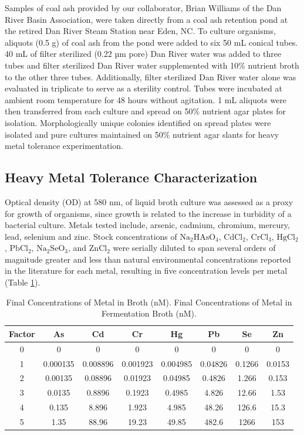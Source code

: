 \documentclass[ms, hidelinks]{uncgdissertationexp3}
\theoremstyle{plain}
\theoremstyle{definition}
\theoremstyle{remark}
\newcommand{\titlecaption}[2]{\caption[#1]{#1. #2}}
\begin{document}
Samples of coal ash provided by our collaborator, Brian Williams of the Dan River Basin Association, were taken directly from a coal ash retention pond at the retired Dan River Steam Station near Eden, NC. To culture organisms, aliquots (0.5 g) of coal ash from the pond were added to six 50 mL conical tubes. 40 mL of filter sterilized (0.22 µm pore) Dan River water was added to three tubes and filter sterilized Dan River water supplemented with 10\% nutrient broth to the other three tubes. Additionally, filter sterilized Dan River water alone was evaluated in triplicate to serve as a sterility control. Tubes were incubated at ambient room temperature for 48 hours without agitation. 1 mL aliquots were then transferred from each culture and spread on 50\% nutrient agar plates for isolation. Morphologically unique colonies identified on spread plates were isolated and pure cultures maintained on 50\% nutrient agar slants for heavy metal tolerance experimentation. 

\subsection{Heavy Metal Tolerance Characterization}\label{heavy-metal-tolerance-characterization}

Optical density (OD) at 580 nm, of liquid broth culture was assessed as a proxy for growth of organisms, since growth is related to the increase in turbidity of a bacterial culture. Metals tested include, arsenic, cadmium, chromium, mercury, lead, selenium and zinc. Stock concentrations of \(\mathrm{Na_2HAsO_4}\), \(\mathrm{CdCl_2}\), \(\mathrm{CrCl_3}\), \(\mathrm{HgCl_2}\), \(\mathrm{PbCl_2}\), \(\mathrm{Na_2SeO_3}\), and \(\mathrm{ZnCl_2}\) were serially diluted to span several orders of magnitude greater and less than natural environmental concentrations reported in the literature for each metal, resulting in five concentration levels per metal (Table \ref{tab:metals}).

\begin{table}[htbp]
\titlecaption{Final Concentrations of Metal in Broth (nM)}{Final Concentrations of Metal in Fermentation Broth (nM).}\label{tab:metals}
\centering
\begin{tabular}{cccccccc}
\toprule
Factor & As & Cd & Cr & Hg & Pb & Se & Zn\\
\midrule
0 & 0 & 0 & 0 & 0 & 0 & 0 & 0\\ 
1 & 0.000135 & 0.008896 & 0.001923 & 0.004985 & 0.04826 & 0.1266 & 0.0153\\
2 & 0.00135 & 0.08896 & 0.01923 & 0.04985 & 0.4826 & 1.266 & 0.153\\
3 & 0.0135 & 0.8896 & 0.1923 & 0.4985 & 4.826 & 12.66 & 1.53\\
4 & 0.135 & 8.896 & 1.923 & 4.985 & 48.26 & 126.6 & 15.3\\
5 & 1.35 & 88.96 & 19.23 & 49.85 & 482.6 & 1266 & 153\\
\bottomrule
\end{tabular}
\vspace{18pt}
\end{table}
\end{document}
